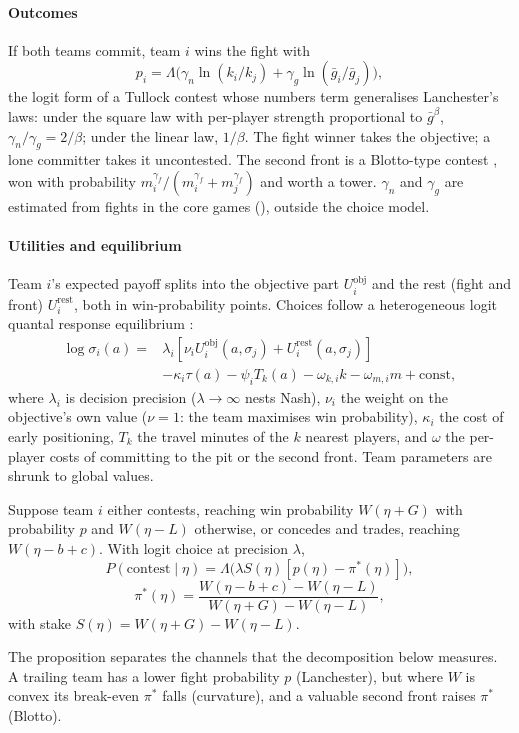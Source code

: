 \paragraph*{Outcomes}
If both teams commit, team $i$ wins the fight with
\begin{equation}
p_i=\Lambda\big(\gamma_n\ln(k_i/k_j)+\gamma_g\ln(\bar g_i/\bar g_j)\big),
\label{eq:tullock}
\end{equation}
the logit form of a Tullock contest \citep{tullock1980efficient} whose numbers term generalises Lanchester's laws: under the square law with per-player strength proportional to $\bar g^{\beta}$, $\gamma_n/\gamma_g=2/\beta$; under the linear law, $1/\beta$.
The fight winner takes the objective; a lone committer takes it uncontested.
The second front is a Blotto-type contest \citep{roberson2006colonel}, won with probability $m_i^{\gamma_f}/(m_i^{\gamma_f}+m_j^{\gamma_f})$ and worth a tower.
$\gamma_n$ and $\gamma_g$ are estimated from fights in the core games (), outside the choice model.

\paragraph*{Utilities and equilibrium}
Team $i$'s expected payoff splits into the objective part $U^{\mathrm{obj}}_i$ and the rest (fight and front) $U^{\mathrm{rest}}_i$, both in win-probability points.
Choices follow a heterogeneous logit quantal response equilibrium \citep{mckelvey1995quantal}:
\begin{equation}
\begin{split}
\log\sigma_i(a)={}&\lambda_i[\nu_i U^{\mathrm{obj}}_i(a,\sigma_j)+U^{\mathrm{rest}}_i(a,\sigma_j)]\\
&-\kappa_i\tau(a)-\psi_i T_k(a)-\omega_{k,i}k-\omega_{m,i}m+\mathrm{const},
\end{split}
\label{eq:qre}
\end{equation}
where $\lambda_i$ is decision precision ($\lambda\to\infty$ nests Nash), $\nu_i$ the weight on the objective's own value ($\nu=1$: the team maximises win probability), $\kappa_i$ the cost of early positioning, $T_k$ the travel minutes of the $k$ nearest players, and $\omega$ the per-player costs of committing to the pit or the second front.
Team parameters are shrunk to global values.

\begin{proposition}\label{prop:threshold}
Suppose team $i$ either contests, reaching win probability $W(\eta+G)$ with probability $p$ and $W(\eta-L)$ otherwise, or concedes and trades, reaching $W(\eta-b+c)$. With logit choice at precision $\lambda$,
\[
P(\text{contest}\mid\eta)=\Lambda\big(\lambda S(\eta)[p(\eta)-\pi^*(\eta)]\big),
\]
\[
\pi^*(\eta)=\frac{W(\eta-b+c)-W(\eta-L)}{W(\eta+G)-W(\eta-L)},
\]
with stake $S(\eta)=W(\eta+G)-W(\eta-L)$.
\end{proposition}
The proposition separates the channels that the decomposition below measures.
A trailing team has a lower fight probability $p$ (Lanchester), but where $W$ is convex its break-even $\pi^*$ falls (curvature), and a valuable second front raises $\pi^*$ (Blotto).

